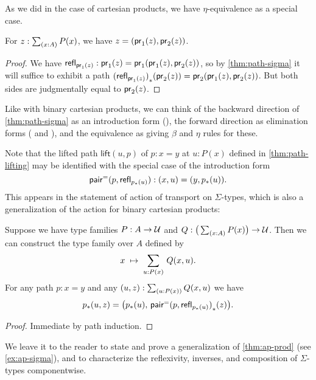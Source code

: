 As we did in the case of cartesian products, we have $\eta$-equivalence as a special case.

\begin{cor}\label{thm:eta-sigma}
  For $z:\sm{x:A} P(x)$, we have $z = (\mathsf{pr}_{1}(z),\mathsf{pr}_{2}(z))$.
\end{cor}
\begin{proof}
  We have $\mathsf{refl}_{\mathsf{pr}_{1}(z)} : \mathsf{pr}_{1}(z) = \mathsf{pr}_{1}(\mathsf{pr}_{1}(z),\mathsf{pr}_{2}(z))$, so by \autoref{thm:path-sigma} it will suffice to exhibit a path ${(\mathsf{refl}_{\mathsf{pr}_{1}(z)})}_{*}\mathopen{}\left({\mathsf{pr}_{2}(z)}\right)\mathclose{} = \mathsf{pr}_{2}(\mathsf{pr}_{1}(z),\mathsf{pr}_{2}(z))$.
  But both sides are judgmentally equal to $\mathsf{pr}_{2}(z)$.
\end{proof}

Like with binary cartesian products, we can think of 
the backward direction of \autoref{thm:path-sigma} as
an introduction form (\pairpath{}{}), the forward direction as
elimination forms ( and ), and the equivalence
as giving $\beta$ and $\eta$ rules for these.  

Note that the lifted path $\mathsf{lift}(u,p)$  of $p:x=y$ at $u:P(x)$ defined in \autoref{thm:path-lifting} may be identified with the special case of the introduction form
\[\mathsf{pair}^{\mathord{=}}(p,\mathsf{refl}_{{p}_{*}\mathopen{}\left({u}\right)\mathclose{}}):(x,u) = (y,{p}_{*}\mathopen{}\left({u}\right)\mathclose{}).\]
This appears in the statement of action of transport on $\Sigma$-types, which is also a generalization of the action for binary cartesian products:

\begin{thm}
  Suppose we have type families $P:A\to\mathcal{U}$ and $Q:\big(\sm{x:A} P(x)\big)\to\type$.
  Then we can construct the type family over $A$ defined by
  \begin{equation*}
    x \;\mapsto\;  \sm{u:P(x)} Q(x,u).
  \end{equation*}
  For any path $p:x=y$ and any $(u,z):\sm{u:P(x)} Q(x,u)$ we have
  \begin{equation*}
    {p}_{*}\mathopen{}\left({u,z}\right)\mathclose{}=\big({p}_{*}\mathopen{}\left({u}\right)\mathclose{},\,{\mathsf{pair}^{\mathord{=}}(p,\mathsf{refl}_{{p}_{*}\mathopen{}\left({u}\right)\mathclose{}})}_{*}\mathopen{}\left({z}\right)\mathclose{}\big).
  \end{equation*}
\end{thm}

\begin{proof}
Immediate by path induction.
\end{proof}

We leave it to the reader to state and prove a generalization of
\autoref{thm:ap-prod} (see \autoref{ex:ap-sigma}), and to characterize
the reflexivity, inverses, and composition of $\Sigma$-types
componentwise.


